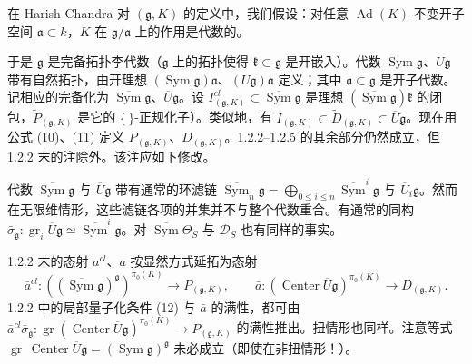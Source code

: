 
在 Harish-Chandra 对 $(\mathfrak{g},K)$ 的定义中，我们假设：对任意 $\operatorname{Ad}(K)$-不变开子空间 $\mathfrak{a}\subset k$，$K$ 在 $\mathfrak{g}/\mathfrak{a}$ 上的作用是代数的。

于是 $\mathfrak{g}$ 是完备拓扑李代数（$\mathfrak{g}$ 上的拓扑使得 $\mathfrak{k}\subset\mathfrak{g}$ 是开嵌入）。代数 $\operatorname{Sym}\mathfrak{g}$、$U\mathfrak{g}$ 带有自然拓扑，由开理想 $(\operatorname{Sym}\mathfrak{g})\mathfrak{a}$、$(U\mathfrak{g})\mathfrak{a}$ 定义；其中 $\mathfrak{a}\subset\mathfrak{g}$ 是开子代数。记相应的完备化为 $\overline{\operatorname{Sym}}\mathfrak{g}$、$\overline{U}\mathfrak{g}$。设 $I^{cl}_{(\mathfrak{g},K)}\subset\overline{\operatorname{Sym}}\mathfrak{g}$ 是理想 $(\overline{\operatorname{Sym}}\mathfrak{g})\mathfrak{k}$ 的闭包，$\tilde{P}_{(\mathfrak{g},K)}$ 是它的 $\{\,\}$-正规化子）。类似地，有 $I_{(\mathfrak{g},K)}\subset\tilde{D}_{(\mathfrak{g},K)}\subset\overline{U}\mathfrak{g}$。现在用公式 (10)、(11) 定义 $P_{(\mathfrak{g},K)}$、$D_{(\mathfrak{g},K)}$。1.2.2--1.2.5 的其余部分仍然成立，但 1.2.2 末的注除外。该注应如下修改。

 代数 $\overline{\operatorname{Sym}}\mathfrak{g}$ 与 $\overline{U}\mathfrak{g}$ 带有通常的环滤链 $\overline{\operatorname{Sym}}_n\mathfrak{g}=\bigoplus_{0\le i\le n}\overline{\operatorname{Sym}}^{i}\mathfrak{g}$ 与 $\overline{U}_i\mathfrak{g}$。然而在无限维情形，这些滤链各项的并集并不与整个代数重合。有通常的同构 $\bar{\sigma}_{\mathfrak{g}}:\operatorname{gr}_i\overline{U}\mathfrak{g}\simeq\overline{\operatorname{Sym}}^{i}\mathfrak{g}$。对 $\overline{\operatorname{Sym}}\Theta_S$ 与 $\mathcal{D}_S$ 也有同样的事实。

1.2.2 末的态射 $a^{cl}$、$a$ 按显然方式延拓为态射
\begin{equation}\tag{17}
\bar{a}^{cl}:((\overline{\operatorname{Sym}}\mathfrak{g})^{\mathfrak{g}})^{\pi_0(K)}\to P_{(\mathfrak{g},K)},\qquad
\bar{a}:(\operatorname{Center}\overline{U}\mathfrak{g})^{\pi_0(K)}\to D_{(\mathfrak{g},K)}.
\end{equation}
1.2.2 中的局部量子化条件 (12) 与 $\bar{a}$ 的满性，都可由 $\bar{a}^{cl}\bar{\sigma}_{\mathfrak{g}}:\operatorname{gr}(\operatorname{Center}\overline{U}\mathfrak{g})^{\pi_0(K)}\to P_{(\mathfrak{g},K)}$ 的满性推出。扭情形也同样。注意等式 $\operatorname{gr}\,\operatorname{Center}\overline{U}\mathfrak{g}=(\operatorname{Sym}\mathfrak{g})^{\mathfrak{g}}$ 未必成立（即使在非扭情形！）。

